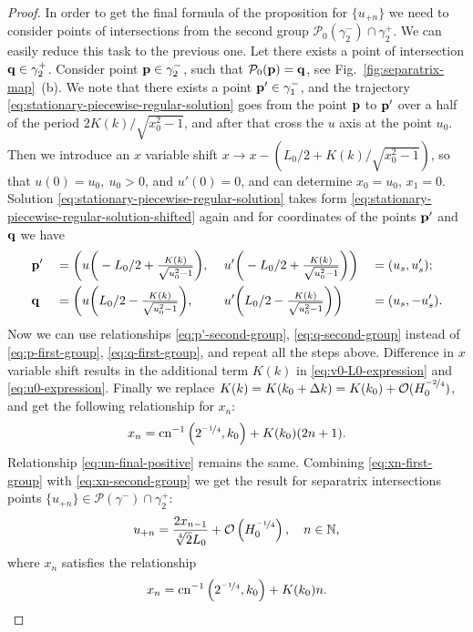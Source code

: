 \begin{proof}
	In order to get the final formula of the proposition for $\{ u_{+n} \}$ we need to consider points of intersections from the second group $\mathcal{P}_0 (\gamma_2^-) \cap \gamma_2^+$.
	We can easily reduce this task to the previous one.
	Let there exists a point of intersection $\vb{q} \in \gamma_2^+$. 
	Consider point $\vb{p} \in \gamma_2^-$, such that $\mathcal{P}_0(\vb{p}) = \vb{q}$, see Fig.~\ref{fig:separatrix-map}~(b).
	We note that there exists a point $\vb{p}' \in \gamma_1^-$, and the trajectory \eqref{eq:stationary-piecewise-regular-solution} goes from the point $\vb{p}$ to $\vb{p}'$ over a half of the period $2K(k) / \sqrt{x_0^2 - 1}$, and after that cross the $u$ axis at the point $u_0$.
	Then we introduce an $x$ variable shift $x \to x - (L_0 / 2 + K(k) / \sqrt{x_0^2 - 1})$, so that $u(0) = u_0, \ u_0 > 0$, and $u'(0) = 0$, and can determine $x_0 = u_0$, $x_1 = 0$.
	Solution \eqref{eq:stationary-piecewise-regular-solution} takes form \eqref{eq:stationary-piecewise-regular-solution-shifted} again and for coordinates of the points $\vb{p}'$ and $\vb{q}$ we have
	\begin{alignat}{4}
		& \vb{p}' && = \bigg( u \bigg( -L_0 / 2 + \tfrac{K(k)}{\sqrt{u_0^2 - 1}} \bigg), && \ u' \bigg( -L_0 / 2 + \tfrac{K(k)}{\sqrt{u_0^2 - 1}} \bigg) \bigg) && = (u_s, u_s'); \label{eq:p'-second-group} \\
		& \vb{q} && = \bigg( u \bigg(L_0 / 2 - \tfrac{K(k)}{\sqrt{u_0^2 - 1}} \bigg),  && \ u' \bigg( L_0 / 2 - \tfrac{K(k)}{\sqrt{u_0^2 - 1}} \bigg) \bigg) && = (u_s, -u_s'). \label{eq:q-second-group}
    \end{alignat}
    Now we can use relationships \eqref{eq:p'-second-group}, \eqref{eq:q-second-group} instead of \eqref{eq:p-first-group}, \eqref{eq:q-first-group}, and repeat all the steps above.
    Difference in $x$ variable shift results in the additional term $K(k)$ in \eqref{eq:v0-L0-expression} and \eqref{eq:u0-expression}.
    Finally we replace $K(k) = K(k_0 + \Delta k) = K(k_0) + \mathcal{O}(H_0^{\nicefrac{-2}{4}})$, and get the following relationship for $x_n$:
	\begin{equation}
		x_n = \mathrm{cn}^{-1} \left( 2^{\nicefrac{-1}{4}}, k_0 \right) + K(k_0) (2n + 1).
	\label{eq:xn-second-group}
	\end{equation}
	Relationship \eqref{eq:un-final-positive} remains the same.
	Combining \eqref{eq:xn-first-group} with \eqref{eq:xn-second-group} we get the result for separatrix intersections points $\{ u_{+n} \} \in \mathcal{P}(\gamma^-) \cap \gamma_2^+$:
	\begin{equation}
		u_{+n} = \frac{2 x_{n-1}}{\sqrt[4]{2} L_0} + \mathcal{O} \left( H_0^{\nicefrac{-1}{4}} \right), \quad n \in \mathbb{N},
	\label{eq:us-final}
	\end{equation}
	where $x_n$ satisfies the relationship
	\begin{equation}
		x_n = \mathrm{cn}^{-1} \left( 2^{\nicefrac{-1}{4}}, k_0 \right) + K(k_0) n.
	\label{eq:xn-final}
	\end{equation}
	

\end{proof}
